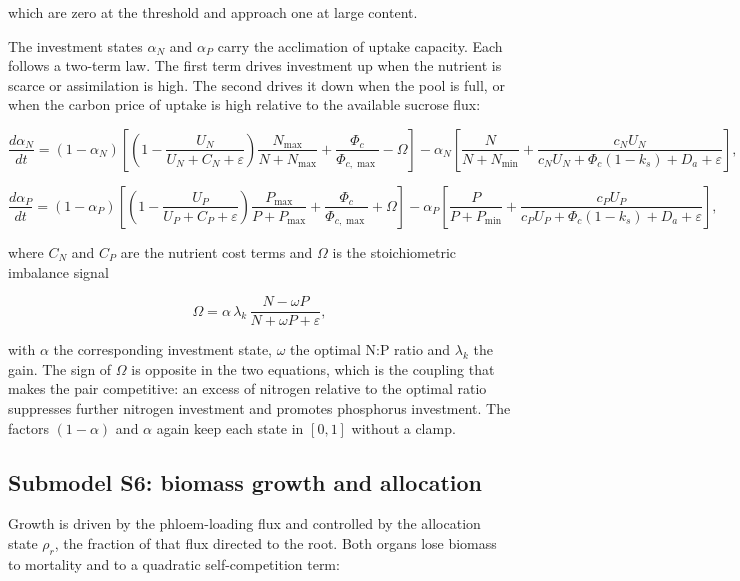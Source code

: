 which are zero at the threshold and approach one at large content.

The investment states $\alpha_N$ and $\alpha_P$ carry the acclimation of uptake
capacity. Each follows a two-term law. The first term drives investment up when the
nutrient is scarce or assimilation is high. The second drives it down when the pool
is full, or when the carbon price of uptake is high relative to the available
sucrose flux:

\begin{equation}
\frac{d\alpha_N}{dt}
= \left(1-\alpha_N\right)
\left[
\left(1 - \frac{U_N}{U_N + C_N + \varepsilon}\right)
\frac{N_{\max}}{N + N_{\max}}
+ \frac{\Phi_c}{\Phi_{c,\max}}
- \Omega
\right]
- \alpha_N
\left[
\frac{N}{N+N_{\min}}
+ \frac{c_N U_N}{c_N U_N + \Phi_c\left(1-k_s\right) + D_a + \varepsilon}
\right],
\label{eq:dalphaN}
\end{equation}

\begin{equation}
\frac{d\alpha_P}{dt}
= \left(1-\alpha_P\right)
\left[
\left(1 - \frac{U_P}{U_P + C_P + \varepsilon}\right)
\frac{P_{\max}}{P + P_{\max}}
+ \frac{\Phi_c}{\Phi_{c,\max}}
+ \Omega
\right]
- \alpha_P
\left[
\frac{P}{P+P_{\min}}
+ \frac{c_P U_P}{c_P U_P + \Phi_c\left(1-k_s\right) + D_a + \varepsilon}
\right],
\label{eq:dalphaP}
\end{equation}

where $C_N$ and $C_P$ are the nutrient cost terms and $\Omega$ is the
stoichiometric imbalance signal

\begin{equation}
\Omega = \alpha\,\lambda_k\,\frac{N - \omega P}{N + \omega P + \varepsilon},
\label{eq:imbalance}
\end{equation}

with $\alpha$ the corresponding investment state, $\omega$ the optimal N:P ratio
and $\lambda_k$ the gain. The sign of $\Omega$ is opposite in the two equations,
which is the coupling that makes the pair competitive: an excess of nitrogen
relative to the optimal ratio suppresses further nitrogen investment and
promotes phosphorus investment. The factors $(1-\alpha)$ and $\alpha$ again keep
each state in $[0,1]$ without a clamp.

\subsection{Submodel S6: biomass growth and allocation}
\label{sec:allocation}

Growth is driven by the phloem-loading flux and controlled by the allocation
state $\rho_r$, the fraction of that flux directed to the root. Both organs
lose biomass to mortality and to a quadratic self-competition term:

